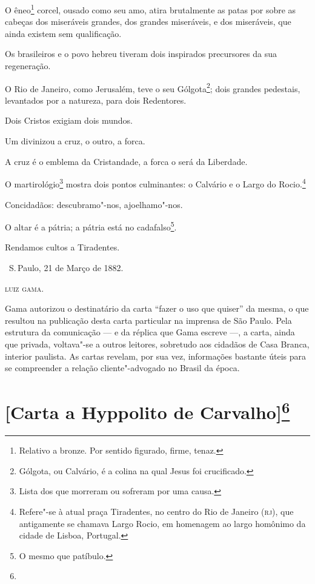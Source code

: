 O êneo\footnote{Relativo a bronze. Por sentido figurado, firme, tenaz.}
corcel, ousado como seu amo, atira brutalmente as patas por sobre as
cabeças dos miseráveis grandes, dos grandes miseráveis, e dos
miseráveis, que ainda existem sem qualificação.

Os brasileiros e o povo hebreu tiveram dois inspirados precursores da
sua regeneração.

O Rio de Janeiro, como Jerusalém, teve o seu Gólgota\footnote{Gólgota,
  ou Calvário, é a colina na qual Jesus foi crucificado.}; dois grandes
pedestais, levantados por a natureza, para dois Redentores.

Dois Cristos exigiam dois mundos.

Um divinizou a cruz, o outro, a forca.

A cruz é o emblema da Cristandade, a forca o será da Liberdade.

O martirológio\footnote{Lista dos que morreram ou sofreram por uma
  causa.} mostra dois pontos culminantes: o Calvário e o Largo do
Rocio.\footnote{Refere"-se à atual praça Tiradentes, no centro do Rio
  de Janeiro (\textsc{rj}), que antigamente se chamava Largo Rocio, em
  homenagem ao largo homônimo da cidade de Lisboa, Portugal.}

Concidadãos: descubramo"-nos, ajoelhamo"-nos.

O altar é a pátria; a pátria está no cadafalso\footnote{O mesmo que
  patíbulo.}.

Rendamos cultos a Tiradentes.

\bigskip

\hfill\ S.\,Paulo, 21 de Março de 1882.\smallskip

\hfill\textsc{luiz gama.}

\pagebreak
\mbox{}\vfill
\thispagestyle{empty}

{\small\noindent
Gama autorizou o destinatário da carta ``fazer o uso que quiser'' da
mesma, o que resultou na publicação desta carta particular na imprensa
de São Paulo. Pela estrutura da comunicação --- e da réplica que Gama
escreve ---, a carta, ainda que privada, voltava"-se a outros leitores,
sobretudo aos cidadãos de Casa Branca, interior paulista. As cartas
revelam, por sua vez, informações bastante úteis para se compreender a
relação cliente"-advogado no Brasil da época.}

\chapter{{[}Carta a Hyppolito de Carvalho{]}\footnote[*]{}}

